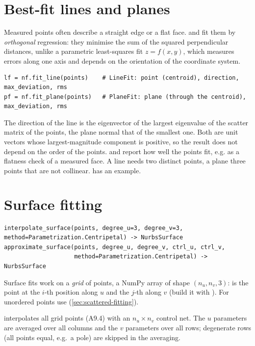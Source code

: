 \section{Best-fit lines and planes}\label{sec:fit-line-plane}

Measured points often describe a straight edge or a flat face.  and
 fit them by \emph{orthogonal} regression: they minimise the sum of the
squared perpendicular distances, unlike a parametric least-squares fit $z = f(x, y)$, which
measures errors along one axis and depends on the orientation of the coordinate system.

\begin{lstlisting}
lf = nf.fit_line(points)    # LineFit: point (centroid), direction, max_deviation, rms
pf = nf.fit_plane(points)   # PlaneFit: plane (through the centroid), max_deviation, rms
\end{lstlisting}

The direction of the line is the eigenvector of the largest eigenvalue of the scatter matrix of
the points, the plane normal that of the smallest one. Both are unit vectors whose
largest-magnitude component is positive, so the result does not depend on the order of the
points.  and  report how well the points fit, e.g. as a flatness
check of a measured face. A line needs two distinct points, a plane three points that are not
collinear.  has an example.

\section{Surface fitting}\label{sec:surface-fitting}

\begin{lstlisting}[style=text]
interpolate_surface(points, degree_u=3, degree_v=3, method=Parametrization.Centripetal) -> NurbsSurface
approximate_surface(points, degree_u, degree_v, ctrl_u, ctrl_v,
                    method=Parametrization.Centripetal) -> NurbsSurface
\end{lstlisting}

Surface fits work on a \emph{grid} of points, a NumPy array of shape $(n_u, n_v, 3)$: 
is the point at the $i$-th position along $u$ and the $j$-th along $v$ (build it with
). For unordered points use 
(\cref{sec:scattered-fitting}).

 interpolates all grid points (A9.4) with an $n_u\times n_v$ control
net. The $u$ parameters are averaged over all columns and the $v$ parameters over all rows;
degenerate rows (all points equal, e.g.\ a pole) are skipped in the averaging.


